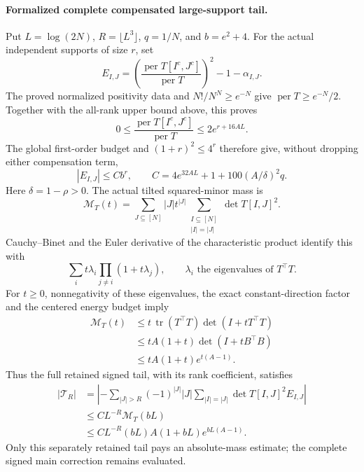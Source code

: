 \paragraph{Formalized complete compensated large-support tail.}
Put \(L=\log(2N)\), \(R=\lfloor L^3\rfloor\), \(q=1/N\), and
\(b=e^2+4\).  For the actual independent supports of size \(r\), set
\[
 E_{I,J}=
 \left(\frac{\operatorname{per}T[I^c,J^c]}
              {\operatorname{per}T}\right)^2-1-\alpha_{I,J}.
\]
The proved normalized positivity data and
\(N!/N^N\geq e^{-N}\) give
\(\operatorname{per}T\geq e^{-N}/2\).
Together with the all-rank upper bound above, this proves
\[
 0\leq\frac{\operatorname{per}T[I^c,J^c]}{\operatorname{per}T}
       \leq2e^{r+16AL}.
\]
The global first-order budget and \((1+r)^2\leq4^r\) therefore give,
without dropping either compensation term,
\[
 |E_{I,J}|\leq C b^r,\qquad
 C=4e^{32AL}+1+100(A/\delta)^2q.
\]
Here \(\delta=1-\rho>0\).
The actual tilted squared-minor mass is
\[
 \mathcal M_T(t)=
 \sum_{J\subseteq[N]} |J|t^{|J|}
   \sum_{\substack{I\subseteq[N]\\|I|=|J|}}\det T[I,J]^2 .
\]
Cauchy--Binet and the Euler derivative of the characteristic
product identify this with
\[
 \sum_i t\lambda_i
           \prod_{j\ne i}(1+t\lambda_j),
 \qquad \lambda_i\text{ the eigenvalues of }T^\top T .
\]
For \(t\geq0\), nonnegativity of these eigenvalues, the exact
constant-direction factor and the centered energy budget imply
\[
 \begin{split}
 \mathcal M_T(t)
   &\leq t\,\operatorname{tr}(T^\top T)\det(I+tT^\top T)\\
   &\leq tA(1+t)\det(I+tB^\top B)\\
   &\leq tA(1+t)e^{t(A-1)}.
 \end{split}
\]
Thus the full retained signed tail, with its rank coefficient,
satisfies
\[
 \begin{split}
 \left|\mathcal T_R\right|
 &=\left|-\sum_{|J|>R}(-1)^{|J|}|J|
          \sum_{|I|=|J|}\det T[I,J]^2E_{I,J}\right|\\
 &\leq C L^{-R}\mathcal M_T(bL)\\
 &\leq C L^{-R}(bL)A(1+bL)e^{bL(A-1)}.
 \end{split}
\]
Only this separately retained tail pays an absolute-mass estimate;
the complete signed main correction remains evaluated.


